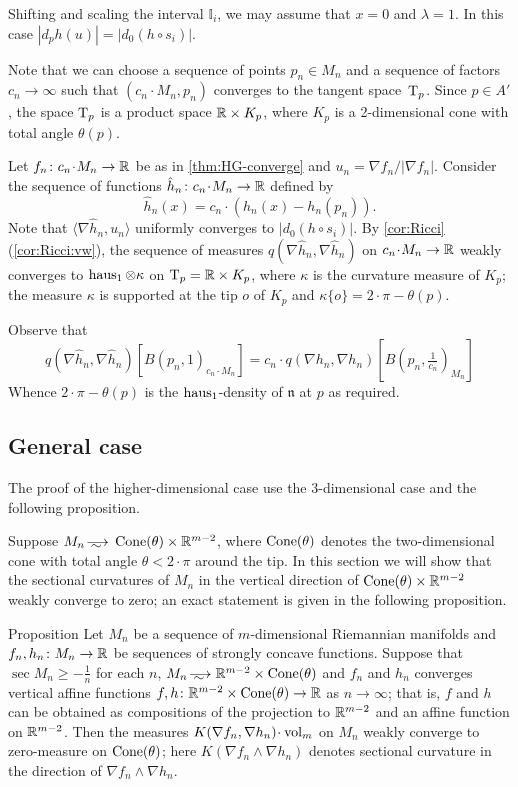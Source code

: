 Shifting and scaling the interval $\mathbb{I}_i$, we may assume that $x=0$ and $\lambda=1$.
In this case $|d_ph(u)|=|d_0(h\circ s_i)|$.

Note that we can choose a sequence of points $p_n\in M_n$ and a sequence of factors $c_n\to \infty$ such that $(c_n\cdot M_n,p_n)$ converges to the tangent space~$\mathrm{T}_p$.
Since $p\in A'$, the space $\mathrm{T}_p$ is a product space $\mathbb{R}\times K_p$, where $K_p$ is a 2-dimensional cone with total angle $\theta(p)$.

Let $f_n\:c_n\cdot M_n\to \RR$ be as in \ref{thm:HG-converge} and $u_n=\nabla f_n/|\nabla f_n|$.
Consider the sequence of functions $\hat h_n\:c_n\cdot M_n\to \RR$ defined by 
\[\hat h_n(x)=c_n\cdot(h_n(x)-h_n(p_n)).\]
Note that $\langle\nabla \hat h_n,u_n\rangle$ uniformly converges to  $|d_0(h\circ s_i)|$.
By \ref{cor:Ricci}(\ref{cor:Ricci:vw}), the sequence of measures $q(\nabla\hat h_n, \nabla\hat h_n)$ on $c_n\cdot M_n\to \RR$ weakly converges to $\operatorname{\rm haus}_1\otimes\kappa $ on $\T_p\zz=\RR\times K_p$, 
where $\kappa$ is the curvature measure of $K_p$; 
the measure $\kappa$ is supported at the tip $o$ of $K_p$
and $\kappa\{o\}=2\cdot \pi-\theta(p)$.

Observe that 
\[q(\nabla\hat h_n, \nabla\hat h_n)[B(p_n,1)_{c_n\cdot M_n}]
=
c_n\cdot q(\nabla h_n, \nabla h_n)[B(p_n,\tfrac1{c_n})_{M_n}]\]
Whence $2\cdot \pi-\theta(p)$ is the $\operatorname{\rm haus}_1$-density of $\mathfrak n$ at $p$ as required.
\qeds

\subsection{General case}

The proof of the higher-dimensional case use the 3-dimensional case and the following proposition.

Suppose $M_n\smooths{} \Cone(\theta)\times \RR^{m-2}$, where $\operatorname{Cone}(\theta)$ denotes the two-dimensional cone with total angle $\theta<2\cdot\pi$ around the tip.
In this section we will show that the sectional curvatures of $M_n$ in the vertical direction of $\operatorname{Cone}(\theta)\times \mathbb{R}^{m-2}$ weakly converge to zero;
an exact statement is given in the following proposition.

\begin{thm}{Proposition}\label{prop:vert-vert}
Let $M_n$ be a sequence of $m$-dimensional Riemannian manifolds
and $f_n,h_n\colon M_n\to \mathbb{R}$ be sequences of strongly concave functions.
Suppose that $\sec M_n\ge -\tfrac1n$ for each $n$, $M_n\smooths{} \RR^{m-2}\times \Cone(\theta)$ and $f_n$ and $h_n$ converges vertical affine functions  $f,h\colon\mathbb{R}^{m-2}\times \operatorname{Cone}(\theta)\to \mathbb{R}$ as $n\to \infty$; that is, $f$ and $h$ can be obtained as compositions of the projection to $\mathbb{R}^{m-2}$ and an affine function on $\mathbb{R}^{m-2}$.
Then the measures $K(\nabla f_n,\nabla h_n)\cdot\vol_m$ on $M_n$ weakly converge to zero-measure on $\operatorname{Cone}(\theta)$;
here $K(\nabla f_n\wedge\nabla h_n)$ denotes sectional curvature in the direction of $\nabla f_n\wedge\nabla h_n$.
\end{thm}

